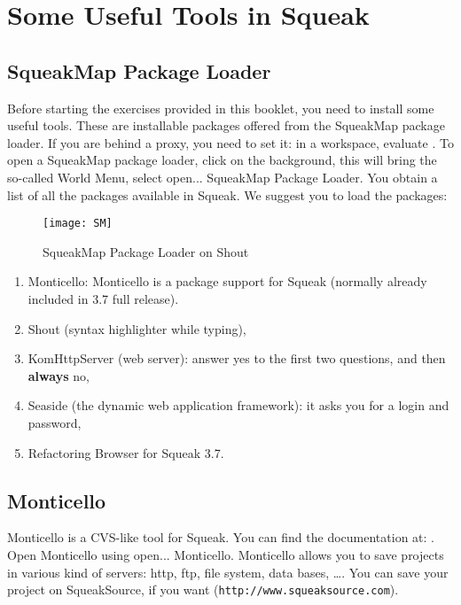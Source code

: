 \ifx\wholebook\relax\else


\fi


\chapter{Some Useful Tools in Squeak}


\section{SqueakMap Package Loader}
Before starting the exercises provided in this booklet, you need to install some useful tools. These are installable packages offered from the SqueakMap package loader. If you are behind a proxy, you need to set it: in a workspace, evaluate . To open a SqueakMap package loader, click on the background, this will bring the so-called World Menu, select open... SqueakMap Package Loader. You obtain a list of all the packages available in Squeak. We suggest you to load the packages: 

\begin{figure}[h]
\begin{center}
\texttt{[image: SM]}
\caption{SqueakMap Package Loader on Shout    \label{sm}}
\end{center}
\end{figure}


\begin{enumerate}
\item Monticello: Monticello is a package support for Squeak (normally already included in 3.7 full release).
\item Shout (syntax highlighter while typing), 
\item KomHttpServer (web server): answer yes to the first two questions, and then \textbf{always} no,
\item Seaside (the dynamic web application framework): it asks you for a login and password,
\item Refactoring Browser for Squeak 3.7. 
\end{enumerate}


\section{Monticello}
Monticello is a CVS-like tool for Squeak. You can find the documentation at: . Open Monticello using open... Monticello. Monticello allows you to save projects in various kind of servers: http, ftp, file system, data bases, \ldots. You can save your project on SqueakSource, if you want (\texttt{http://www.squeaksource.com}).

